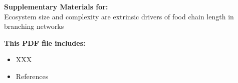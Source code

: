 \begin{center}
\LARGE{\textbf{Supplementary Materials for:}}\\[7.5mm]
\LARGE{Ecosystem size and complexity are extrinsic drivers of food chain length in branching networks}\\[7.5mm]
\end{center}
\begin{flushleft}
\textbf{This PDF file includes:}
\begin{itemize}
\item XXX
\item References
\end{itemize}
\end{flushleft}

\newpage